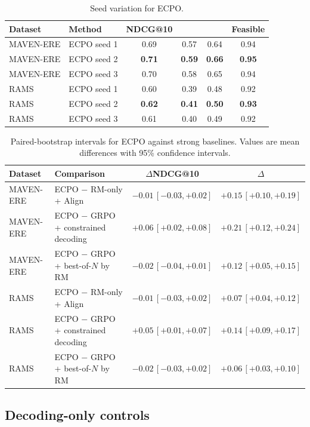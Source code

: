 \documentclass{article}
\begin{document}
\begin{table}[h]
\centering
\caption{Seed variation for ECPO.}
\label{tab:seed_variation_ecpo}
\small
\begin{tabular}{l l c c c c}
\toprule
Dataset & Method & NDCG@10 & \CertNDCG@10 & \EvidCons@10 & Feasible \\
\midrule
MAVEN-ERE & ECPO seed 1 & 0.69 & 0.57 & 0.64 & 0.94 \\
MAVEN-ERE & ECPO seed 2 & \textbf{0.71} & \textbf{0.59} & \textbf{0.66} & \textbf{0.95} \\
MAVEN-ERE & ECPO seed 3 & 0.70 & 0.58 & 0.65 & 0.94 \\
RAMS & ECPO seed 1 & 0.60 & 0.39 & 0.48 & 0.92 \\
RAMS & ECPO seed 2 & \textbf{0.62} & \textbf{0.41} & \textbf{0.50} & \textbf{0.93} \\
RAMS & ECPO seed 3 & 0.61 & 0.40 & 0.49 & 0.92 \\
\bottomrule
\end{tabular}
\end{table}

\begin{table}[h]
\centering
\caption{Paired-bootstrap intervals for ECPO against strong baselines. Values are mean differences with 95\% confidence intervals.}
\label{tab:paired_bootstrap_ecpo}
\small
\begin{tabular}{l l c c}
\toprule
Dataset & Comparison & $\Delta$NDCG@10 & $\Delta$\CertNDCG@10 \\
\midrule
MAVEN-ERE & ECPO $-$ RM-only + Align & $-0.01\,[-0.03,+0.02]$ & $+0.15\,[+0.10,+0.19]$ \\
MAVEN-ERE & ECPO $-$ GRPO + constrained decoding & $\mathbf{+0.06}\,[+0.02,+0.08]$ & $\mathbf{+0.21}\,[+0.12,+0.24]$ \\
MAVEN-ERE & ECPO $-$ GRPO + best-of-$N$ by RM & $-0.02\,[-0.04,+0.01]$ & $+0.12\,[+0.05,+0.15]$ \\
RAMS & ECPO $-$ RM-only + Align & $-0.01\,[-0.03,+0.02]$ & $+0.07\,[+0.04,+0.12]$ \\
RAMS & ECPO $-$ GRPO + constrained decoding & $\mathbf{+0.05}\,[+0.01,+0.07]$ & $\mathbf{+0.14}\,[+0.09,+0.17]$ \\
RAMS & ECPO $-$ GRPO + best-of-$N$ by RM & $-0.02\,[-0.03,+0.02]$ & $+0.06\,[+0.03,+0.10]$ \\
\bottomrule
\end{tabular}
\end{table}

\subsection{Decoding-only controls}
\label{sec:app_decoding_controls}
\end{document}
